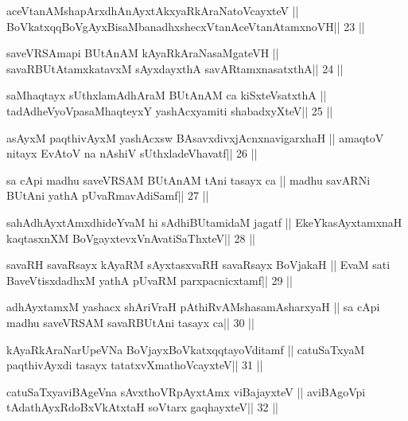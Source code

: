 \begin{shl}
aceVtanAMshapArxdhAnAyxtAkxyaRkAraNatoVcayxteV ||
BoVkatxqqBoVgAyxBisaMbanadhxshecxVtanAceVtanAtamxnoVH\hfill || 23 ||
\end{shl}

\begin{shl}
saveVRSAmapi BUtAnAM kAyaRkAraNasaMgateVH ||
savaRBUtAtamxkatavxM sAyxdayxthA savARtamxnasatxthA\hfill || 24 ||
\end{shl}

\begin{shl}
saMhaqtayx sUthxlamAdhAraM BUtAnAM ca kiSxteVsatxthA ||
tadAdheVyoVpasaMhaqteyxY yashAcxyamiti shabadxyXteV\hfill || 25 ||
\end{shl}

\begin{shl}
asAyxM paqthivAyxM yashAcxsw BAsavxdivxjAcnxnavigarxhaH ||
amaqtoV nitayx EvAtoV na nAshiV sUthxladeVhavatf\hfill || 26 ||
\end{shl}

\begin{shl}
sa cApi madhu saveVRSAM BUtAnAM tAni tasayx ca ||
madhu savARNi BUtAni yathA pUvaRmavAdiSamf\hfill || 27 ||
\end{shl}

\begin{shl}
sahAdhAyxtAmxdhideYvaM hi sAdhiBUtamidaM jagatf ||
EkeYkasAyx\s\s tamxnaH kaqtasxnXM BoVgayxtevxVnAvatiSaThxteV\hfill || 28 ||
\end{shl}

\begin{shl}
savaRH savaRsayx kAyaRM sAyxtasxvaRH savaRsayx BoVjakaH ||
EvaM sati BaveVtisxdadhxM yathA pUvaRM parxpacnicxtamf\hfill || 29 ||
\end{shl}

\begin{shl}
adhAyxtamxM yashacx shAriVraH pAthiRvAMshasamAsharxyaH ||
sa cApi madhu saveVRSAM savaRBUtAni tasayx ca\hfill || 30 ||
\end{shl}

\begin{shl}
kAyaRkAraNarUpeVNa BoVjayxBoVkatxqqtayoVditamf ||
catuSaTxyaM paqthivAyxdi tasayx tatatxvXmathoVcayxteV\hfill || 31 ||
\end{shl}

\begin{shl}
catuSaTxyaviBAgeVna sAvxthoVR\s pAyxtAmx viBajayxteV ||
aviBAgoV\s pi tAdathAyxRdoBxVkAtx\s taH soV\s tarx gaqhayxteV\hfill || 32 ||
\end{shl}


